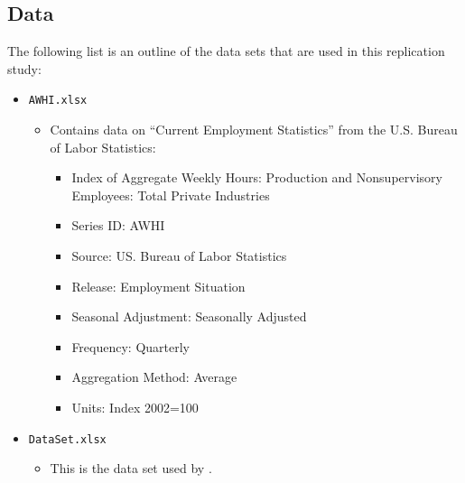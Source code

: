 \subsection{Data}
\label{sec:appendix_data}

The following list is an outline of the data sets that are used in this replication study:


\begin{itemize}
\item \texttt{AWHI.xlsx} 
	\begin{itemize}
		\item Contains data on ``Current Employment Statistics'' from the U.S. Bureau of Labor Statistics:
		\begin{itemize} 
		 	\item Index of Aggregate Weekly Hours: Production and Nonsupervisory Employees: Total Private Industries
			\item Series ID: AWHI
			\item Source: US. Bureau of Labor Statistics
			\item Release: Employment Situation
			\item Seasonal Adjustment: Seasonally Adjusted
			\item Frequency: Quarterly
			\item Aggregation Method: Average
			\item Units: Index 2002=100
		\end{itemize}
	\end{itemize}

\item \texttt{DataSet.xlsx}
	\begin{itemize}
		\item This is the data set used by \cite{JERMANNfinancial}.
	\end{itemize}


\end{itemize}
